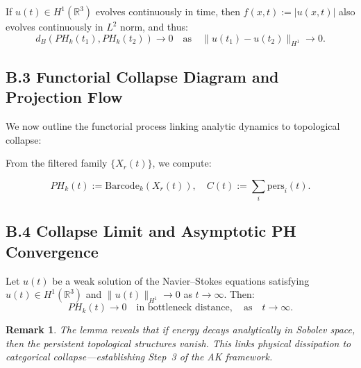 \documentclass[11pt]{article}
\newtheorem{remark}[theorem]{Remark}
\begin{document}
\begin{corollary}
If $u(t) \in H^1(\mathbb{R}^3)$ evolves continuously in time, then $f(x,t) := |u(x,t)|$ also evolves continuously in $L^2$ norm, and thus:
\[
d_B(PH_k(t_1), PH_k(t_2)) \to 0 \quad \text{as} \quad \|u(t_1) - u(t_2)\|_{H^1} \to 0.
\]
\end{corollary}

\subsection*{B.3 Functorial Collapse Diagram and Projection Flow}

We now outline the functorial process linking analytic dynamics to topological collapse:

\begin{center}
\end{center}

From the filtered family $\{X_r(t)\}$, we compute:

\[
PH_k(t) := \mathrm{Barcode}_k(X_r(t)),
\quad C(t) := \sum_i \text{pers}_i(t).
\]

\subsection*{B.4 Collapse Limit and Asymptotic PH Convergence}

\begin{lemma}
Let $u(t)$ be a weak solution of the Navier–Stokes equations satisfying $u(t) \in H^1(\mathbb{R}^3)$ and $\|u(t)\|_{H^1} \to 0$ as $t \to \infty$. Then:
\[
PH_k(t) \to 0 \quad \text{in bottleneck distance}, \quad \text{as} \quad t \to \infty.
\]
\end{lemma}

\begin{remark}
The lemma reveals that if energy decays analytically in Sobolev space, then the persistent topological structures vanish. This links physical dissipation to categorical collapse—establishing Step~3 of the AK framework.
\end{remark}
\end{document}
